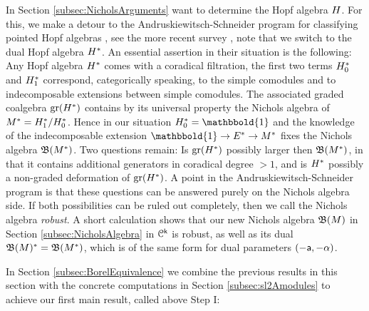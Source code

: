 \documentclass[a4paper, reqno]{amsart}
\theoremstyle{introTheorems}
\newcommand\cC{\mathcal{C}}
\newcommand{\gr}{\textup{gr}}
\renewcommand{\1}{\mathbbold{1}}
\begin{document}
In Section \ref{subsec:NicholsArguments}
want to determine the Hopf algebra $H$. For this, we make a detour to the Andruskiewitsch-Schneider program for classifying pointed Hopf algebras \cite{AS10}, see the more recent survey \cite{AG19}, note that we switch to the dual Hopf algebra $H^*$. An essential assertion in their situation is the following: 
Any Hopf algebra $H^*$ comes with a coradical filtration, the first two terms $H^*_0$ and $H^*_1$ correspond, categorically speaking, to the simple comodules and to indecomposable extensions between simple comodules. The associated graded coalgebra $\gr(\Nichols^*)$ contains by its universal property the Nichols algebra of $M^*=H^*_1/H^*_0$. Hence in our situation $\Nichols^*_0=\1$ and the knowledge of the indecomposable extension $\1\to E^*\to M^*$ fixes the Nichols algebra $\mathfrak{B}(M^*)$. Two questions remain: Is  $\gr(\Nichols^*)$ possibly larger then $\mathfrak{B}(M^*)$, in that it contains additional generators in coradical degree $>1$, and is $H^*$ possibly a non-graded deformation of  $\gr(\Nichols^*)$. A point in the Andruskiewitsch-Schneider program is that these questions can be answered purely on the Nichols algebra side. If both possibilities can be ruled out completely, then we call the Nichols algebra \emph{robust}. A short calculation shows that our new Nichols algebra $\mathfrak{B}(M)$ in Section \ref{subsec:NicholsAlgebra} in $\cC^\k$ is robust, as well as its dual $\mathfrak{B}(M)^*=\mathfrak{B}(M^*)$, which is of the same form for dual parameters $(-\mathsf{a},-\alpha)$.

In Section \ref{subsec:BorelEquivalence} we combine the previous results in this section with the concrete computations in Section \ref{subsec:sl2Amodules} to achieve our first main result, called above Step I:\\
\end{document}
